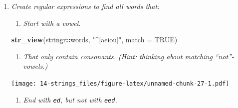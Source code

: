 \documentclass[]{book}
\newenvironment{Shaded}{\begin{snugshade}}{\end{snugshade}}
\newcommand{\DataTypeTok}[1]{\textcolor[rgb]{0.13,0.29,0.53}{#1}}
\newcommand{\KeywordTok}[1]{\textcolor[rgb]{0.13,0.29,0.53}{\textbf{#1}}}
\newcommand{\NormalTok}[1]{#1}
\newcommand{\OperatorTok}[1]{\textcolor[rgb]{0.81,0.36,0.00}{\textbf{#1}}}
\newcommand{\OtherTok}[1]{\textcolor[rgb]{0.56,0.35,0.01}{#1}}
\newcommand{\StringTok}[1]{\textcolor[rgb]{0.31,0.60,0.02}{#1}}
\providecommand{\tightlist}{%
  \setlength{\itemsep}{0pt}\setlength{\parskip}{0pt}}
\theoremstyle{definition}
\theoremstyle{definition}
\theoremstyle{definition}
\theoremstyle{remark}
\begin{document}
\begin{enumerate}
\def\labelenumi{\arabic{enumi}.}
\item
  \emph{Create regular expressions to find all words that:}

  \begin{enumerate}
  \def\labelenumii{\arabic{enumii}.}
  \tightlist
  \item
    \emph{Start with a vowel.}
  \end{enumerate}

\begin{Shaded}
\begin{Highlighting}[]
\KeywordTok{str_view}\NormalTok{(stringr}\OperatorTok{::}\NormalTok{words, }\StringTok{"^[aeiou]"}\NormalTok{, }\DataTypeTok{match =} \OtherTok{TRUE}\NormalTok{)}
\end{Highlighting}
\end{Shaded}

  \begin{enumerate}
  \def\labelenumii{\arabic{enumii}.}
  \setcounter{enumii}{1}
  \tightlist
  \item
    \emph{That only contain consonants. (Hint: thinking about matching }
    \emph{``not''-vowels.)}
  \end{enumerate}

\begin{Shaded}
\end{Shaded}

  \texttt{[image: 14-strings\_files/figure-latex/unnamed-chunk-27-1.pdf]}

  \begin{enumerate}
  \def\labelenumii{\arabic{enumii}.}
  \setcounter{enumii}{2}
  \tightlist
  \item
    \emph{End with \texttt{ed}, but not with \texttt{eed}.}
  \end{enumerate}

\begin{Shaded}
\end{Shaded}


\end{enumerate}
\end{document}
